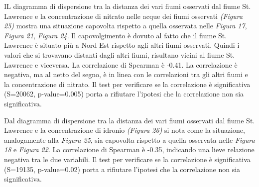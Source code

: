 \documentclass{article} %
\begin{document}
IL diagramma di dispersione tra la distanza dei vari fiumi osservati dal fiume St. Lawrence e la concentrazione di nitrato nelle acque dei fiumi osservati \textit{(Figura 25)} mostra una situazione capovolta rispetto a quella osservata nelle \textit{Figura 17}, \textit{Figura 21}, \textit{Figura 24}.
Il capovolgimento è dovuto al fatto che il fiume St. Lawrence è situato più a Nord-Est rispetto agli altri fiumi osservati. Quindi i valori che si trovavano distanti dagli altri fiumi, risultano vicini al fiume St. Lawrence e viceversa. 
La correlazione di Spearman è -0.41. La correlazione è negativa, ma al netto del segno, è in linea con le correlazioni tra gli altri fiumi e la concentrazione di nitrato.  
Il test per verificare se la correlazione è significativa (S=20062, p-value=0.005) porta a rifiutare l'ipotesi che la correlazione non sia significativa.

Dal diagramma di dispersione tra la distanza dei vari fiumi osservati dal fiume St. Lawrence e la concentrazione di idronio \textit{(Figura 26)} si nota come la situazione, analogamente alla \textit{Figura 25}, sia capovolta rispetto a quella osservata nelle \textit{Figura 18} e \textit{Figura 22}.
La correlazione di Spearman è -0.35, indicando una lieve relazione negativa tra le due variabili. 
Il test per verificare se la correlazione è significativa (S=19135, p-value=0.02) porta a rifiutare l'ipotesi che la correlazione non sia significativa.
\end{document}
